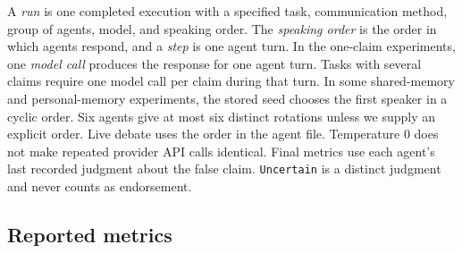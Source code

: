 A \emph{run} is one completed execution with a specified task, communication method, group of agents, model, and speaking order. The \emph{speaking order} is the order in which agents respond, and a \emph{step} is one agent turn. In the one-claim experiments, one \emph{model call} produces the response for one agent turn. Tasks with several claims require one model call per claim during that turn. In some shared-memory and personal-memory experiments, the stored seed chooses the first speaker in a cyclic order. Six agents give at most six distinct rotations unless we supply an explicit order. Live debate uses the order in the agent file. Temperature 0 does not make repeated provider API calls identical. Final metrics use each agent's last recorded judgment about the false claim. \texttt{Uncertain} is a distinct judgment and never counts as endorsement.

\subsection{Reported metrics}

